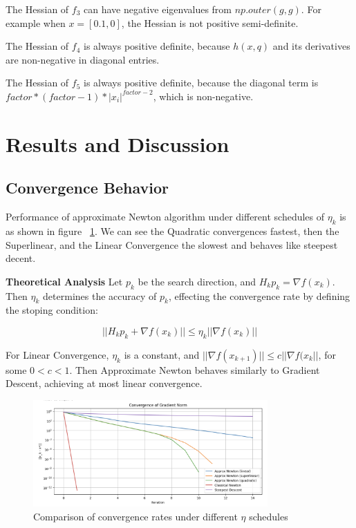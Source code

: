 \documentclass[12pt]{article}
\begin{document}
The Hessian of $f_3$ can have negative eigenvalues from $np.outer(g,g)$. For example when $x=[0.1,0]$, the Hessian is not positive semi-definite.

The Hessian of $f_4$ is always positive definite, because $h(x,q)$ and its derivatives are non-negative in diagonal entries.

The Hessian of $f_5$ is always positive definite, because the diagonal term is $factor*(factor-1)*|x_i|^{factor-2}$, which is non-negative.


\section{Results and Discussion}

\subsection{Convergence Behavior}

Performance of approximate Newton algorithm under different schedules of $\eta_k$ is as shown in figure ~\ref{fig:convergence}. We can see the Quadratic  convergences fastest, then the Superlinear, and the Linear Convergence the slowest and behaves like steepest decent.

\textbf{Theoretical Analysis} Let $p_k$ be the search direction, and $H_k p_k = \nabla f(x_k)$. Then $\eta_k$ determines the accuracy of $p_k$, effecting the convergence rate by defining the stoping condition:

\begin{equation}
||H_k p_k + \nabla f(x_k)|| \leq \eta_k || \nabla f(x_k) ||
\end{equation}

For Linear Convergence, $\eta_k$ is a constant, and $||\nabla f(x_{k+1})|| \leq c ||\nabla f(x_{k}||$, for some $0<c<1$. Then Approximate Newton behaves similarly to Gradient Descent, achieving at most linear convergence.




\begin{figure}[h]
    \centering
    \includegraphics[width=0.8\textwidth]{pics/h3-1}
    \caption{Comparison of convergence rates under different $\eta$ schedules}
    \label{fig:convergence}
\end{figure}
\end{document}

